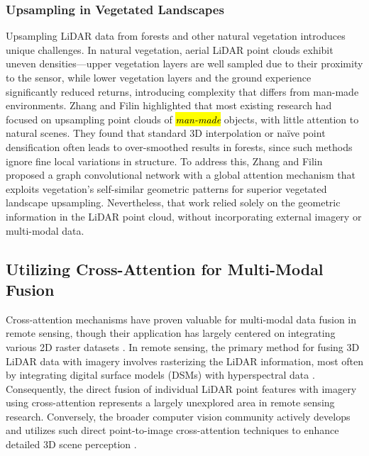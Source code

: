 \documentclass[remotesensing,article,accept,pdftex,moreauthors]{Definitions/mdpi}
\begin{document}
\subsubsection{Upsampling in Vegetated Landscapes}

Upsampling LiDAR data from forests and other natural vegetation introduces unique challenges. In natural vegetation, aerial LiDAR point clouds exhibit uneven densities—upper vegetation layers are well sampled due to their proximity to the sensor, while lower vegetation layers and the ground experience significantly reduced returns, introducing complexity that differs from man-made environments. Zhang and Filin \cite{zhang2022deep} highlighted that most existing research had focused on upsampling point clouds of \emph{\hl{man-made}} objects, with little attention to natural scenes. They found that standard 3D interpolation or naïve point densification often leads to over-smoothed results in forests, since such methods ignore fine local variations in structure. To address this, Zhang and Filin proposed a graph convolutional network with a global attention mechanism that exploits vegetation's self-similar geometric patterns for superior vegetated landscape upsampling. Nevertheless, that work relied solely on the geometric information in the LiDAR point cloud, without incorporating external imagery or multi-modal data.

\subsection{Utilizing Cross-Attention for Multi-Modal Fusion}

Cross-attention mechanisms have proven valuable for multi-modal data fusion in remote sensing, though their application has largely centered on integrating various 2D raster datasets \cite{yan2025remote, ma2022crossmodal, qingyun2022cross, li2024cross}. In remote sensing, the primary method for fusing 3D LiDAR data with imagery involves rasterizing the LiDAR information, most often by integrating digital surface models (DSMs) with hyperspectral data \cite{yu2024dmsca, li2024multi, yang2024lidar}. Consequently, the direct fusion of individual LiDAR point features with imagery using cross-attention represents a largely unexplored area in remote sensing research. Conversely, the broader computer vision community actively develops and utilizes such direct point-to-image cross-attention techniques to enhance detailed 3D scene perception \cite{zhu2024cams, yoo20203d, wu2021point}.
\end{document}

